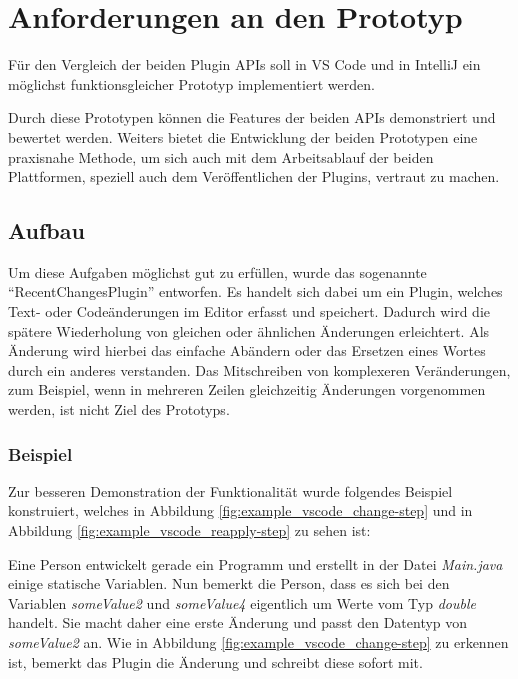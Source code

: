 \chapter{Anforderungen an den Prototyp}
\label{cha:Prototyp}

Für den Vergleich der beiden Plugin APIs soll 
in VS Code und in IntelliJ ein möglichst funktionsgleicher 
Prototyp implementiert werden.

Durch diese Prototypen können die Features der beiden APIs 
demonstriert und bewertet werden. Weiters bietet die Entwicklung
der beiden Prototypen
eine praxisnahe Methode, um sich auch mit dem Arbeitsablauf der
beiden Plattformen, speziell auch dem Veröffentlichen
der Plugins, vertraut zu machen.

\section{Aufbau}
\label{sec:Prototyp_Aufbau}

Um diese Aufgaben möglichst gut zu erfüllen, wurde das sogenannte
\enquote{RecentChangesPlugin} entworfen. Es handelt sich 
dabei um ein Plugin, welches Text- oder Codeänderungen 
im Editor erfasst und speichert. Dadurch wird die spätere
Wiederholung von gleichen oder ähnlichen Änderungen erleichtert.
Als Änderung wird hierbei das einfache Abändern oder das Ersetzen eines
Wortes durch ein anderes verstanden. 
Das Mitschreiben von komplexeren Veränderungen, zum Beispiel, 
wenn in mehreren Zeilen gleichzeitig Änderungen vorgenommen 
werden, ist nicht Ziel des Prototyps.

\subsection{Beispiel}

Zur besseren Demonstration der Funktionalität wurde folgendes 
Beispiel konstruiert, welches in Abbildung \ref{fig:example_vscode_change-step}
und in Abbildung \ref{fig:example_vscode_reapply-step}
zu sehen ist:

Eine Person entwickelt gerade ein Programm und erstellt 
in der Datei \emph{Main.java} einige statische Variablen.
Nun bemerkt die Person, dass es sich bei den Variablen 
\emph{someValue2} und \emph{someValue4} eigentlich um 
Werte vom Typ \emph{double} handelt. Sie macht daher eine 
erste Änderung und passt den Datentyp von \emph{someValue2} an.
Wie in Abbildung \ref{fig:example_vscode_change-step} zu erkennen ist,
bemerkt das Plugin die Änderung und schreibt diese sofort mit.

